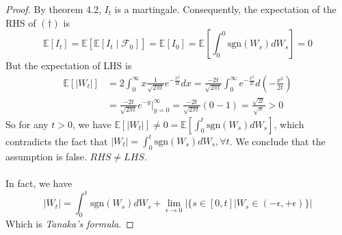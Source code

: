 \documentclass[a4paper, 10pt]{article}
\theoremstyle{definition}
\theoremstyle{hSol}
\begin{document}
\begin{proof}
By theorem 4.2, $I_t$ is a martingale. Consequently, the expectation of the RHS of $(\dag)$ is
\begin{equation}
	\mathbb{E}\left[I_t\right] = \mathbb{E}\left[\mathbb{E}\left[I_t\middle|\mathcal{F}_0\right]\right] = \mathbb{E}\left[I_0\right]= \mathbb{E}\left[\int_0^0 \text{sgn}(W_s)dW_s\right] = 0
\end{equation}
But the expectation of LHS is
\begin{equation}
	\begin{split}
		\mathbb{E}\left[|W_t|\right] &= 2\int_0^{\infty} x \frac{1}{\sqrt{2\pi t}} e^{-\frac{x^2}{2t}} dx = \frac{-2t}{\sqrt{2\pi t}}\int_0^{\infty}  e^{-\frac{x^2}{2t}} d\left(-\frac{x^2}{2t}\right) \\
		&=\frac{-2t}{\sqrt{2\pi t}} e^{-y}\biggr\rvert_{y=0}^{\infty} = \frac{-2t}{\sqrt{2\pi t}}(0-1) = \frac{\sqrt{2t}}{\sqrt{\pi}} > 0
	\end{split}
\end{equation}
So for any $t>0$, we have $\mathbb{E}\left[|W_t|\right] \ne 0 = \mathbb{E}\left[\int_0^t \text{sgn}(W_s)dW_s\right]$, which contradicts the fact that $|W_t|=\int_0^t \text{sgn}(W_s)dW_s, \forall t$. We conclude that the assumption is false. $RHS \ne LHS$.\\
~\\
In fact, we have
\begin{equation}
	|W_t| = \int_0^t \text{sgn}(W_s)dW_s + \lim\limits_{\epsilon \rightarrow 0}|\{s\in [0,t]|W_s \in (-\epsilon, + \epsilon)\}|
\end{equation}
Which is \textit{Tanaka's formula}.
\end{proof}
\end{document}
